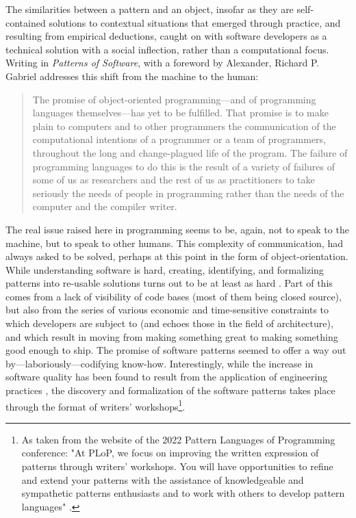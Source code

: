 The similarities between a pattern and an object, insofar as they are self-contained solutions to contextual situations that emerged through practice, and resulting from empirical deductions, caught on with software developers as a technical solution with a social inflection, rather than a computational focus. Writing in \emph{Patterns of Software}, with a foreword by Alexander, Richard P. Gabriel addresses this shift from the machine to the human:

\begin{quote}
    The promise of object-oriented programming—and of programming languages themselves—has yet to be fulfilled. That promise is to make plain to computers and to other programmers the communication of the computational intentions of a programmer or a team of programmers, throughout the long and change-plagued life of the program. The failure of programming languages to do this is the result of a variety of failures of some of us as researchers and the rest of us as practitioners to take seriously the needs of people in programming rather than the needs of the computer and the compiler writer. \citep{gabriel_patterns_1998}
\end{quote}

The real issue raised here in programming seems to be, again, not to speak to the machine, but to speak to other humans. This complexity of communication, had always asked to be solved, perhaps at this point in the form of object-orientation. While understanding software is hard, creating, identifying, and formalizing patterns into re-usable solutions turns out to be at least as hard \citep{taylor_patterns_2001}. Part of this comes from a lack of visibility of code bases (most of them being closed source), but also from the series of various economic and time-sensitive constraints to which developers are subject to (and echoes those in the field of architecture), and which result in moving from making something great to making something good enough to ship. The promise of software patterns seemed to offer a way out by—laboriously—codifying know-how. Interestingly, while the increase in software quality has been found to result from the application of engineering practices \citep{hoare_how_1996}, the discovery and formalization of the software patterns takes place through the format of writers' workshops\footnote{As taken from the website of the 2022 Pattern Languages of Programming conference: "At PLoP, we focus on improving the written expression of patterns through writers' workshops. You will have opportunities to refine and extend your patterns with the assistance of knowledgeable and sympathetic patterns enthusiasts and to work with others to develop pattern languages" \citep{guerra_plop_2022}.}.

